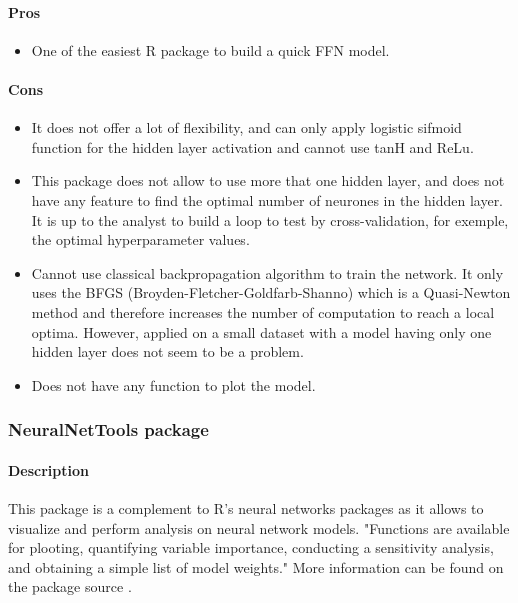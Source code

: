 \documentclass[letter,8pt]{article}\usepackage[]{graphicx}\usepackage[]{color}
\begin{document}
\paragraph{Pros}
\begin{itemize}
\item One of the easiest R package to build a quick FFN model.
\end{itemize}
\paragraph{Cons}
\begin{itemize}
\item It does not offer a lot of flexibility, and can only apply logistic sifmoid function for the hidden layer activation and cannot use tanH and ReLu.
\item This package does not allow to use more that one hidden layer, and does not have any feature to find the optimal number of neurones in the hidden layer. It is up to the analyst to build a loop to test by cross-validation, for exemple, the optimal hyperparameter values.
\item Cannot use classical backpropagation algorithm to train the network. It only uses the BFGS (Broyden-Fletcher-Goldfarb-Shanno) which is a Quasi-Newton method and therefore increases the number of computation to reach a local optima. However, applied on a small dataset with a model having only one hidden layer does not seem to be a problem.
\item Does not have any function to plot the model.
\end{itemize}


\subsubsection{\textbf{NeuralNetTools package}}
\paragraph{Description}
This package is a complement to R's neural networks packages as it allows to visualize and perform analysis on neural network models. "Functions are available for plooting, quantifying variable importance, conducting a sensitivity analysis, and obtaining a simple list of model weights." More information can be found on the package source \cite{NeuralNetTools2018}.
\end{document}
